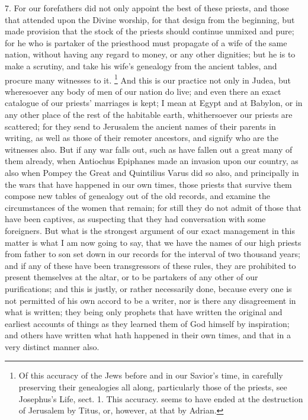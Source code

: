 7. For our forefathers did not only appoint the best of these priests, and
those that attended upon the Divine worship, for that design from the
beginning, but made provision that the stock of the priests should
continue unmixed and pure; for he who is partaker of the priesthood must
propagate of a wife of the same nation, without having any regard to
money, or any other dignities; but he is to make a scrutiny, and take his
wife's genealogy from the ancient tables, and procure many witnesses to
it. \footnote{Of this accuracy of the
Jews before and in our Savior's time, in carefully preserving their
genealogies all along, particularly those of the priests, see Josephus's
Life, sect. 1. This accuracy. seems to have ended at the destruction of
Jerusalem by Titus, or, however, at that by Adrian.}
And this is our practice not only in Judea, but wheresoever any body of
men of our nation do live; and even there an exact catalogue of our
priests' marriages is kept; I mean at Egypt and at Babylon, or in any
other place of the rest of the habitable earth, whithersoever our priests
are scattered; for they send to Jerusalem the ancient names of their
parents in writing, as well as those of their remoter ancestors, and
signify who are the witnesses also. But if any war falls out, such as have
fallen out a great many of them already, when Antiochus Epiphanes made an
invasion upon our country, as also when Pompey the Great and Quintilius
Varus did so also, and principally in the wars that have happened in our
own times, those priests that survive them compose new tables of genealogy
out of the old records, and examine the circumstances of the women that
remain; for still they do not admit of those that have been captives, as
suspecting that they had conversation with some foreigners. But what is
the strongest argument of our exact management in this matter is what I am
now going to say, that we have the names of our high priests from father
to son set down in our records for the interval of two thousand years; and
if any of these have been transgressors of these rules, they are
prohibited to present themselves at the altar, or to be partakers of any
other of our purifications; and this is justly, or rather necessarily
done, because every one is not permitted of his own accord to be a writer,
nor is there any disagreement in what is written; they being only prophets
that have written the original and earliest accounts of things as they
learned them of God himself by inspiration; and others have written what
hath happened in their own times, and that in a very distinct manner also.

